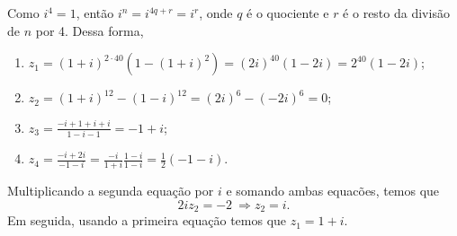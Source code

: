 \begin{questions}
\begin{solution}
Como $i^4 = 1$, então $i^n = i^{4q+r} = i^r$, onde $q$ é o quociente e $r$ é o resto da divisão de $n$ por 4. Dessa forma,
\begin{enumerate}[label=(\alph*)]
  \item $ z_1 = (1 + i)^{2\cdot 40} (1 - (1 + i)^{2}) = (2i)^{40} (1-2i) = 2^{40}(1-2i)$;
  \item $z_2 = (1+i)^{12} - (1-i)^{12} = (2i)^6 - (-2i)^6 = 0$;
  \item $\displaystyle  z_3 = \frac{-i + 1 + i + i}{1 - i -1} = -1+i$;
  \item $\displaystyle z_4 = \frac{-i + 2i}{-1 - i} = \frac{-i}{1 + i}\frac{1-i}{1-i} = \frac{1}{2}(-1-i)$.
\end{enumerate}
\end{solution}


\begin{solution}
Multiplicando a segunda equação por $i$ e somando ambas equacões, temos que
    \[
        2iz_2 = -2 ~\Rightarrow \boxed{z_2 = i}.
    \]
Em seguida, usando a primeira equação temos que $\boxed{z_1 = 1+i}$.
\end{solution}



\end{questions}
